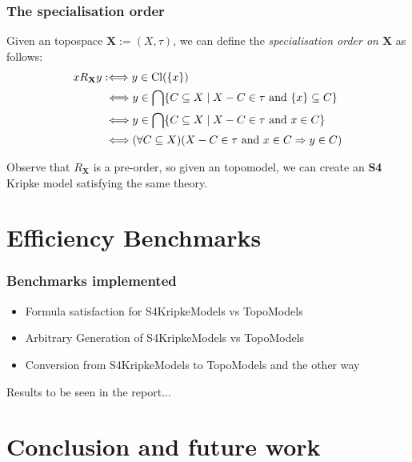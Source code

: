 \documentclass[
	11pt, %
	aspectratio=1610, %
]{beamer}
\begin{document}
\begin{frame}
	\frametitle{The specialisation order}

	Given an topospace $\mathbf{X} := (X, \tau)$, we can define the \emph{specialisation order on $\mathbf{X}$} as follows:
	\begin{align*}
		xR_{\mathbf{X}}y &:\Longleftrightarrow y \in \text{Cl}(\{x\}) \\
		                 &~\Longleftrightarrow y \in \bigcap \{ C \subseteq X \mid  X-C \in \tau \text{ and } \{x\} \subseteq C \} \\
		                 &~\Longleftrightarrow y \in \bigcap \{ C \subseteq X \mid  X-C \in \tau \text{ and } x \in C \} \\
		                 &~\Longleftrightarrow (\forall C \subseteq X)(X-C \in \tau \text{ and } x \in C \Rightarrow y \in C)
	\end{align*}

	\bigskip

	Observe that $R_{\mathbf{X}}$ is a pre-order, so given an topomodel, we can create an \textbf{S4} Kripke model satisfying the same theory.

\end{frame}


\section{Efficiency Benchmarks}


\begin{frame}
	\frametitle{Benchmarks implemented}

	\begin{itemize}
		\item Formula satisfaction for S4KripkeModels vs TopoModels
		\item Arbitrary Generation of S4KripkeModels vs TopoModels
		\item Conversion from S4KripkeModels to TopoModels and the other way
	\end{itemize}

	Results to be seen in the report...
\end{frame}

\section{Conclusion and future work}
\end{document}
